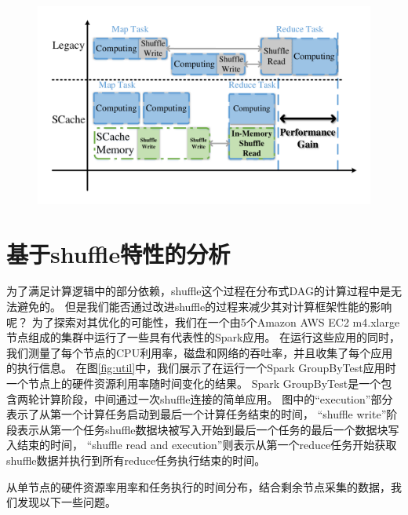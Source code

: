 \begin{figure}[!htp]
	\centering
	\includegraphics[width=\textwidth]{../../PPoPP-2018/fig/workflow.pdf}
\end{figure}

\section{基于shuffle特性的分析}

为了满足计算逻辑中的部分依赖，shuffle这个过程在分布式DAG的计算过程中是无法避免的。
但是我们能否通过改进shuffle的过程来减少其对计算框架性能的影响呢？
为了探索对其优化的可能性，我们在一个由5个Amazon AWS EC2 m4.xlarge\cite{aws}节点组成的集群中运行了一些具有代表性的Spark应用。
在运行这些应用的同时，我们测量了每个节点的CPU利用率，磁盘和网络的吞吐率，并且收集了每个应用的执行信息。
在图\ref{fig:util}中，我们展示了在运行一个Spark GroupByTest应用时一个节点上的硬件资源利用率随时间变化的结果。
Spark GroupByTest是一个包含两轮计算阶段，中间通过一次shuffle连接的简单应用。
图中的“execution”部分表示了从第一个计算任务启动到最后一个计算任务结束的时间，
“shuffle write”阶段表示从第一个任务shuffle数据块被写入开始到最后一个任务的最后一个数据块写入结束的时间，
“shuffle read and execution”则表示从第一个reduce任务开始获取shuffle数据并执行到所有reduce任务执行结束的时间。

从单节点的硬件资源率用率和任务执行的时间分布，结合剩余节点采集的数据，我们发现以下一些问题。

